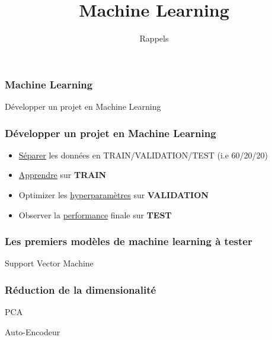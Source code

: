 \documentclass{formation}
\title{Machine Learning}
\subtitle{Rappels}
\begin{document}
\maketitle

\begin{frame}
  \frametitle{Machine Learning}
  \begin{center}
  Développer un projet en Machine Learning
  \end{center}
\end{frame}

\begin{frame}
  \frametitle{Développer un projet en Machine Learning}
  \begin{itemize}
  \item \underline{Séparer} les données en TRAIN/VALIDATION/TEST (i.e 60/20/20)
  \item \underline{Apprendre} sur \textbf{TRAIN}
  \item Optimizer les \underline{hyperparamètres} sur \textbf{VALIDATION}
  \item Observer la \underline{performance} finale sur \textbf{TEST}
  \end{itemize}
\end{frame}

\begin{frame}
  \frametitle{Les premiers modèles de machine learning à tester}
  \begin{minipage}[l]{0.49\linewidth}
    \begin{center}
      Support Vector Machine
    \end{center}
  \end{minipage}\hfill
  \begin{minipage}[l]{0.49\linewidth}
  \end{minipage}\hfill
\end{frame}

\begin{frame}
  \frametitle{Réduction de la dimensionalité}
  \begin{minipage}[l]{0.39\linewidth}
    \begin{center}
      PCA
    \end{center}
  \end{minipage}\hfill
  \begin{minipage}[l]{0.60\linewidth}
    \begin{center}
      Auto-Encodeur
    \end{center}
  \end{minipage}\hfill
\end{frame}
\end{document}
